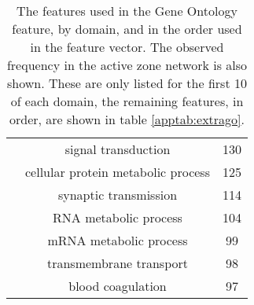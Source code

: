 \begin{table}
\begin{tabular}{l c c}
                            & signal transduction & 130 \\
                            & cellular protein metabolic process & 125 \\
                            & synaptic transmission & 114 \\
                            & RNA metabolic process & 104 \\
                            & mRNA metabolic process & 99 \\
                            & transmembrane transport & 98 \\
                            & blood coagulation & 97 \\
    \end{tabular}
    \caption{The features used in the Gene Ontology feature, by domain, and in the order used in the feature vector. The observed frequency in the active zone network is also shown. These are only listed for the first 10 of each domain, the remaining features, in order, are shown in table \ref{apptab:extrago}.}
    \label{apptab:go}
\end{table}


